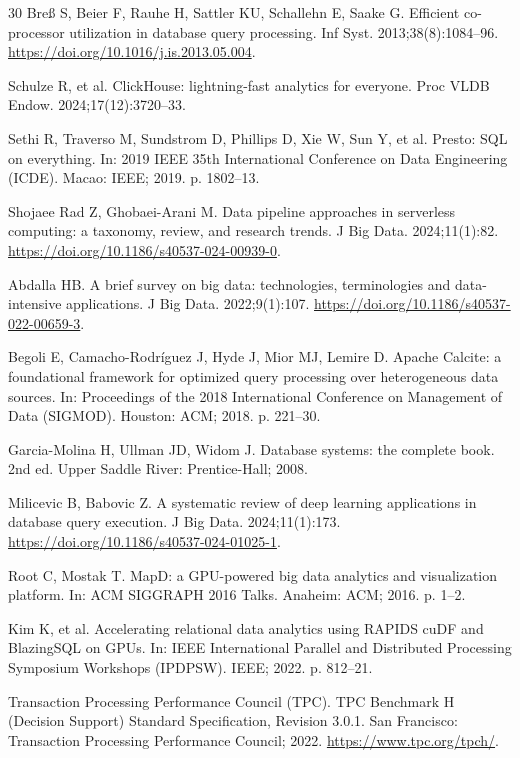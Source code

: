 \documentclass[10pt,a4paper]{article}
\begin{document}
{\begin{thebibliography}{30}
Bre{\ss} S, Beier F, Rauhe H, Sattler KU, Schallehn E, Saake G. Efficient co-processor utilization in database query processing. Inf Syst. 2013;38(8):1084--96. \url{https://doi.org/10.1016/j.is.2013.05.004}.

Schulze R, et al. ClickHouse: lightning-fast analytics for everyone. Proc VLDB Endow. 2024;17(12):3720--33.

Sethi R, Traverso M, Sundstrom D, Phillips D, Xie W, Sun Y, et al. Presto: SQL on everything. In: 2019 IEEE 35th International Conference on Data Engineering (ICDE). Macao: IEEE; 2019. p. 1802--13.

 Shojaee Rad Z, Ghobaei-Arani M. Data pipeline approaches in serverless computing: a taxonomy, review, and research trends. J Big Data. 2024;11(1):82. \url{https://doi.org/10.1186/s40537-024-00939-0}.

Abdalla HB. A brief survey on big data: technologies, terminologies and data-intensive applications. J Big Data. 2022;9(1):107. \url{https://doi.org/10.1186/s40537-022-00659-3}.

Begoli E, Camacho-Rodr{\'i}guez J, Hyde J, Mior MJ, Lemire D. Apache Calcite: a foundational framework for optimized query processing over heterogeneous data sources. In: Proceedings of the 2018 International Conference on Management of Data (SIGMOD). Houston: ACM; 2018. p. 221--30.

Garcia-Molina H, Ullman JD, Widom J. Database systems: the complete book. 2nd ed. Upper Saddle River: Prentice-Hall; 2008.

Milicevic B, Babovic Z. A systematic review of deep learning applications in database query execution. J Big Data. 2024;11(1):173. \url{https://doi.org/10.1186/s40537-024-01025-1}.

Root C, Mostak T. MapD: a GPU-powered big data analytics and visualization platform. In: ACM SIGGRAPH 2016 Talks. Anaheim: ACM; 2016. p. 1--2.

Kim K, et al. Accelerating relational data analytics using RAPIDS cuDF and BlazingSQL on GPUs. In: IEEE International Parallel and Distributed Processing Symposium Workshops (IPDPSW). IEEE; 2022. p. 812--21.

Transaction Processing Performance Council (TPC). TPC Benchmark H (Decision Support) Standard Specification, Revision 3.0.1. San Francisco: Transaction Processing Performance Council; 2022. \url{https://www.tpc.org/tpch/}.


\end{thebibliography}}
\end{document}
